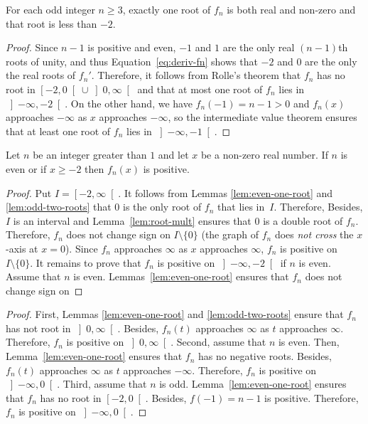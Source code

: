  \begin{lemma} \label{lem:odd-two-roots}   
   For each odd integer $n \ge 3$,
   exactly one root of $f_n$ is both real and non-zero and that root is less than $- 2$.
 \end{lemma}

 \begin{proof}
   Since $n - 1$ is positive and even,
   $- 1$ and $1$ are the only real $(n - 1)$th roots of unity,
   and thus Equation~\eqref{eq:deriv-fn} shows that $- 2$ and $0$ are the only the real roots of $f_n'$.
   Therefore, it follows from Rolle's theorem that
   $f_n$ has no root in $\left[- 2, 0 \right[ \cup \left]0,  \infty \right[$
   and that
   at most one root of $f_n$ lies in $\left]- \infty, - 2 \right[$.
   On the other hand, we have $f_n(-1) = n - 1 > 0$ and $f_n(x)$ approaches $- \infty$ as $x$ approaches $- \infty$,
   so the intermediate value theorem ensures that at least one root of $f_n$ lies in $\left]- \infty, -1 \right[$.
 \end{proof}

 \begin{theorem} \label{thm:Bernoulli}
   Let $n$ be an integer greater than $1$ and let $x$ be a non-zero real number.
   If $n$ is even or if $x \ge - 2$ then $f_n(x)$ is positive.
 \end{theorem}
 
 \begin{proof}
   Put $I = \left[- 2, \infty \right[$.
   It follows from Lemmas \ref{lem:even-one-root} and  \ref{lem:odd-two-roots}
   that $0$ is the only root of $f_n$ that lies in~$I$.
   Therefore, 
   Besides, $I$ is an interval and Lemma~\ref{lem:root-mult} ensures that $0$ is a double root of $f_n$.
   Therefore, $f_n$ does not change sign on $I \setminus \{ 0 \}$
   (the graph of $f_n$ does \emph{not cross}  the $x$-axis at $x = 0$).
   Since $f_n$ approaches $\infty$ as $x$ approaches $\infty$,
   $f_n$ is positive on $I \setminus \{ 0 \}$.
   It remains to prove that $f_n$ is positive on $\left]- \infty, - 2\right[$ if $n$ is even.
   Assume that $n$ is even.
   Lemmas~\ref{lem:even-one-root} ensures that $f_n$ does not change sign on
 \end{proof}
 
 \begin{proof}
   First, Lemmas \ref{lem:even-one-root} and  \ref{lem:odd-two-roots} ensure that
   $f_n$ has not root in  $\left]0, \infty \right[$.   
   Besides, $f_n(t)$ approaches $\infty$ as $t$ approaches $\infty$.
   Therefore, $f_n$ is positive on $\left]0, \infty \right[$.
   Second, assume that $n$ is even.
   Then, Lemma~\ref{lem:even-one-root} ensures that $f_n$ has no negative roots.
   Besides,  $f_n(t)$ approaches $\infty$ as $t$ approaches $- \infty$.
   Therefore, $f_n$ is positive on $\left]- \infty, 0 \right[$.
   Third, assume that $n$ is odd.
   Lemma~\ref{lem:even-one-root} ensures that $f_n$ has no root in $\left[- 2, 0 \right[$.
   Besides, $f(- 1) = n - 1$ is positive.
   Therefore, $f_n$ is positive on $\left]- \infty, 0 \right[$.
 \end{proof}
 

